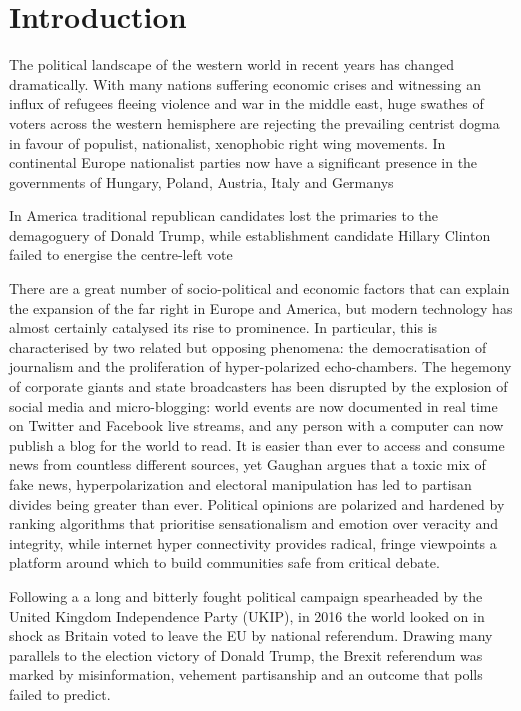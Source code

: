 \documentclass[Dissertation.tex]{subfiles}
\begin{document}
\chapter{Introduction}
The political landscape of the western world in recent years has changed dramatically. With many nations suffering economic crises and witnessing an influx of refugees fleeing violence and war in the middle east, huge swathes of voters across the western hemisphere are rejecting the prevailing centrist dogma in favour of populist, nationalist, xenophobic right wing movements. In continental Europe nationalist parties now have a significant presence in the governments of Hungary, Poland, Austria, Italy and Germanys 

In America traditional republican candidates lost the primaries to the demagoguery of Donald Trump, while establishment candidate Hillary Clinton failed to energise the centre-left vote%

There are a great number of socio-political and economic factors that can explain the expansion of the far right in Europe and America, but modern technology has almost certainly catalysed its rise to prominence. In particular, this is characterised by two related but opposing phenomena: the democratisation of journalism and the proliferation of hyper-polarized echo-chambers. The hegemony of corporate giants and state broadcasters has been disrupted by the explosion of social media and micro-blogging:  world events are now documented in real time on Twitter and Facebook live streams, and any person with a computer can now publish a blog for the world to read. It is easier than ever to access and consume news from countless different sources, yet Gaughan \cite{gaughanIlliberalDemocracyToxic2017} argues that a toxic mix of fake news, hyperpolarization and electoral manipulation has led to partisan divides being greater than ever. Political opinions are polarized and hardened by ranking algorithms that prioritise sensationalism and emotion over veracity and integrity, while internet hyper connectivity provides radical, fringe viewpoints a platform around which to build communities safe from critical debate. 

Following a a long and bitterly fought political campaign spearheaded by the United Kingdom Independence Party (UKIP), in 2016 the world looked on in shock as Britain voted to leave the EU by national referendum. Drawing many parallels to the election victory of Donald Trump, the Brexit referendum was marked by misinformation, vehement partisanship and an outcome that polls failed to predict.
\end{document}
